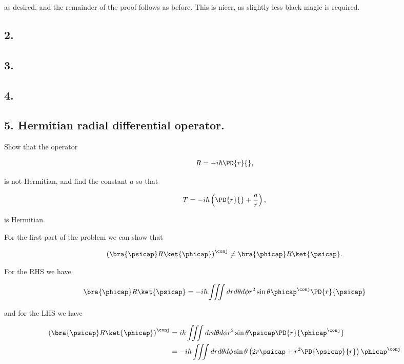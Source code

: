 as desired, and the remainder of the proof follows as before.  This is nicer, as slightly less black magic is required.

\subsection{2.}
\subsection{3.}
\subsection{4.}
\subsection{5. Hermitian radial differential operator.}

Show that the operator 

\begin{align*}
R = -i \hbar \PD{r}{},
\end{align*}

is not Hermitian, and find the constant $a$ so that 

\begin{align*}
T = -i \hbar \left( \PD{r}{} + \frac{a}{r} \right),
\end{align*}

is Hermitian.

For the first part of the problem we can show that

\begin{align*}
\left( \bra{\psicap} R \ket{\phicap} \right)^\conj \ne \bra{\phicap} R \ket{\psicap}.
\end{align*}

For the RHS we have

\begin{align*}
\bra{\phicap} R \ket{\psicap} 
= -i \hbar \iiint dr d\theta d\phi r^2 \sin\theta \phicap^\conj \PD{r}{\psicap}
\end{align*}

and for the LHS we have

\begin{align*}
\left( \bra{\psicap} R \ket{\phicap} \right)^\conj
&= i \hbar \iiint dr d\theta d\phi r^2 \sin\theta \psicap \PD{r}{\phicap^\conj} \\
&= -i \hbar \iiint dr d\theta d\phi \sin\theta 
\left( 2 r \psicap 
+ r^2 \PD{\psicap}{r} 
\right)
\phicap^\conj 
\\
\end{align*}

